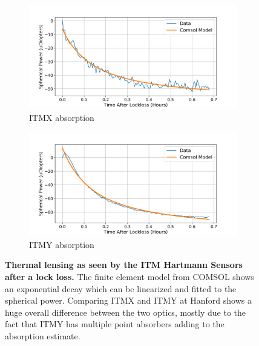 \begin{figure}[ht]
\centering
\begin{subfigure}[a]{0.7\textwidth}
	\centering
	\includegraphics[width=\textwidth]{../Figures/itmx_HWS_Absorption.png}
	\caption{ITMX absorption}
	\label{fig:itmx_abs}
\end{subfigure}
\hfill
\begin{subfigure}[b]{0.7\textwidth}
	\centering
	\includegraphics[width=\textwidth]{../Figures/itmy_HWS_Absorption.png}
	\caption{ITMY absorption}
	\label{fig:itmy_abs}
\end{subfigure}
	\caption[Thermal lensing as seen by the ITM Hartmann Sensors after a lock loss.]  
	{\textbf{Thermal lensing as seen by the ITM Hartmann Sensors after a lock loss.} The finite element model from COMSOL shows an exponential decay which can be linearized and fitted to the spherical power. Comparing ITMX and ITMY at Hanford shows a huge overall difference between the two optics, mostly due to the fact that ITMY has multiple point absorbers adding to the absorption estimate.}
\label{fig:hws_abs}
\end{figure}

